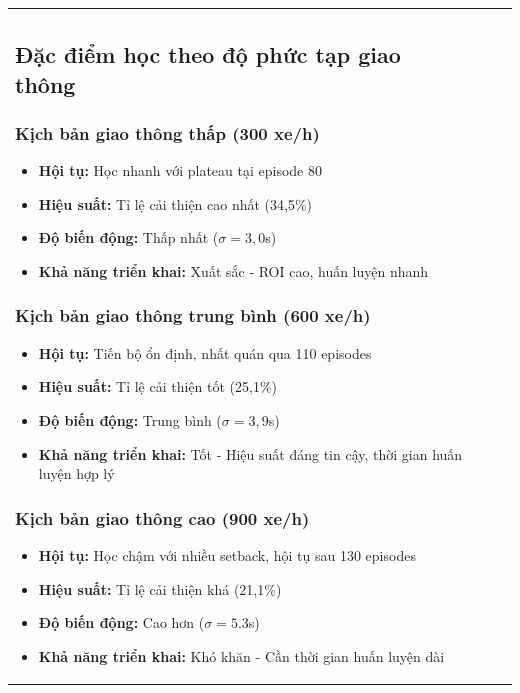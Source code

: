 \begin{table}[!htp]
\begin{tabular}{@{}lccc@{}}
\subsection{Đặc điểm học theo độ phức tạp giao thông}

\subsubsection{Kịch bản giao thông thấp (300 xe/h)}
\begin{itemize}
    \item \textbf{Hội tụ:} Học nhanh với plateau tại episode 80
    \item \textbf{Hiệu suất:} Tỉ lệ cải thiện cao nhất (34,5\%)
    \item \textbf{Độ biến động:} Thấp nhất ($\sigma = 3,0$s)
    \item \textbf{Khả năng triển khai:} Xuất sắc - ROI cao, huấn luyện nhanh
\end{itemize}

\subsubsection{Kịch bản giao thông trung bình (600 xe/h)}
\begin{itemize}
    \item \textbf{Hội tụ:} Tiến bộ ổn định, nhất quán qua 110 episodes
    \item \textbf{Hiệu suất:} Tỉ lệ cải thiện tốt (25,1\%)
    \item \textbf{Độ biến động:} Trung bình ($\sigma = 3,9$s)
    \item \textbf{Khả năng triển khai:} Tốt - Hiệu suất đáng tin cậy, thời gian huấn luyện hợp lý
\end{itemize}

\subsubsection{Kịch bản giao thông cao (900 xe/h)}
\begin{itemize}
    \item \textbf{Hội tụ:} Học chậm với nhiều setback, hội tụ sau 130 episodes
    \item \textbf{Hiệu suất:} Tỉ lệ cải thiện khá (21,1\%)
    \item \textbf{Độ biến động:} Cao hơn ($\sigma = 5.3$s)
    \item \textbf{Khả năng triển khai:} Khó khăn - Cần thời gian huấn luyện dài
\end{itemize}


\end{tabular}
\end{table}
